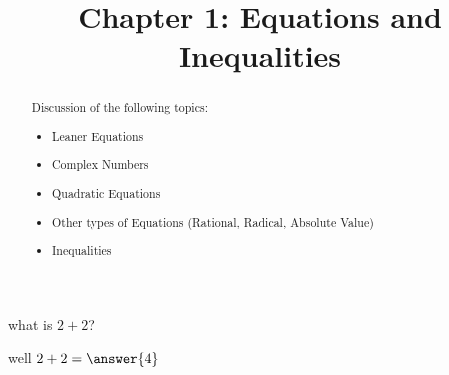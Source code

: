 \documentclass[handout]{ximera}
\title{Chapter 1: Equations and Inequalities}
\begin{document}
\begin{abstract}
	Discussion of the following topics:
    \begin{itemize}
    	\item Leaner Equations
        \item Complex Numbers
        \item Quadratic Equations
        \item Other types of Equations (Rational, Radical, Absolute Value)
        \item Inequalities
    \end{itemize}
	
\end{abstract}
\maketitle

\begin{problem}
what is $2+2$?

well $2+2=\answer{4}$
\end{problem}
\end{document}
